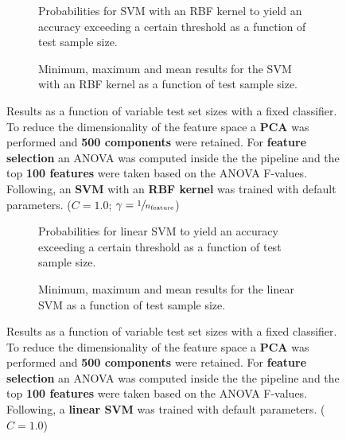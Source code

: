 \begin{figure}
    \captionsetup[subfigure]{justification=justified,singlelinecheck=false}
    \begin{subfigure}[t]{0.61\textwidth}
        
        \caption{Probabilities for SVM with an RBF kernel to yield an accuracy exceeding a certain threshold as a function of test sample size.}
    \end{subfigure}
    \hspace{3.0mm}
    \begin{subfigure}[t]{0.34\textwidth}
        
        \caption{Minimum, maximum and mean results for the SVM with an RBF kernel as a function of test sample size.}
    \end{subfigure}
    \caption[Effects of varying test sample size. SVM (kernel = RBF); Preprocessing: PCA ($n_\text{components} = \num{500}$); ANOVA feature selection ($k_\text{best} = \num{100}$)]{Results as a function of variable test set sizes with a fixed classifier. To reduce the dimensionality of the feature space a \textbf{PCA} was performed and \textbf{500 components} were retained. For \textbf{feature selection} an ANOVA was computed inside the the pipeline and the top \textbf{100 features} were taken based on the ANOVA F-values. Following, an \textbf{{SVM}} with an \textbf{{RBF kernel}} was trained with default parameters. ($C=\num{1.0}$; $\gamma=\sfrac{1}{n_\text{feature}}$)}
    \label{fig:PCA_500_components_100_best_selected_SVC}
\end{figure}

\begin{figure}
    \captionsetup[subfigure]{justification=justified,singlelinecheck=false}
    \begin{subfigure}[t]{0.61\textwidth}
        
        \caption{Probabilities for linear SVM to yield an accuracy exceeding a certain threshold as a function of test sample size.}
    \end{subfigure}
    \hspace{3.0mm}
    \begin{subfigure}[t]{0.34\textwidth}
        
        \caption{Minimum, maximum and mean results for the linear SVM as a function of test sample size.}
    \end{subfigure}
    \caption[Effects of varying test sample size. Linear SVM; Preprocessing: PCA ($n_\text{components} = \num{500}$); ANOVA feature selection ($k_\text{best} = \num{100}$)]{Results as a function of variable test set sizes with a fixed classifier. To reduce the dimensionality of the feature space a \textbf{PCA} was performed and \textbf{500 components} were retained. For \textbf{feature selection} an ANOVA was computed inside the the pipeline and the top \textbf{100 features} were taken based on the ANOVA F-values. Following, a \textbf{{linear SVM}} was trained with default parameters. ($C=\num{1.0}$)}
    \label{fig:PCA_500_components_100_best_selected_LinearSVC}
\end{figure}

